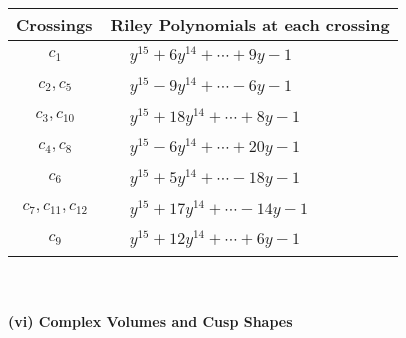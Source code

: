 \documentclass[1p]{elsarticle_modified}
\theoremstyle{definition}
\begin{document}
\begin{tabular}{m{50pt}|m{274pt}}
Crossings & \hspace{64pt}Riley Polynomials at each crossing \\
\hline $$\begin{aligned}c_{1}\end{aligned}$$&$\begin{aligned}
&y^{15}+6 y^{14}+\cdots+9 y-1
\end{aligned}$\\
\hline $$\begin{aligned}c_{2},c_{5}\end{aligned}$$&$\begin{aligned}
&y^{15}-9 y^{14}+\cdots-6 y-1
\end{aligned}$\\
\hline $$\begin{aligned}c_{3},c_{10}\end{aligned}$$&$\begin{aligned}
&y^{15}+18 y^{14}+\cdots+8 y-1
\end{aligned}$\\
\hline $$\begin{aligned}c_{4},c_{8}\end{aligned}$$&$\begin{aligned}
&y^{15}-6 y^{14}+\cdots+20 y-1
\end{aligned}$\\
\hline $$\begin{aligned}c_{6}\end{aligned}$$&$\begin{aligned}
&y^{15}+5 y^{14}+\cdots-18 y-1
\end{aligned}$\\
\hline $$\begin{aligned}c_{7},c_{11},c_{12}\end{aligned}$$&$\begin{aligned}
&y^{15}+17 y^{14}+\cdots-14 y-1
\end{aligned}$\\
\hline $$\begin{aligned}c_{9}\end{aligned}$$&$\begin{aligned}
&y^{15}+12 y^{14}+\cdots+6 y-1
\end{aligned}$\\
\hline
\end{tabular}\\~\\
\newpage\flushleft \textbf{(vi) Complex Volumes and Cusp Shapes}
\end{document}
